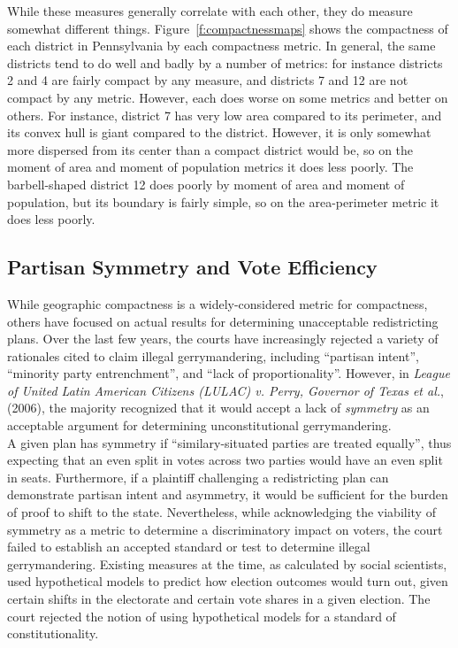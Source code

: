\documentclass[12pt]{article}
\begin{document}
  While these measures generally correlate with each other, they do measure somewhat different things.  Figure~\ref{f:compactnessmaps} shows the compactness of each district in Pennsylvania by each compactness metric.  In general, the same districts tend to do well and badly by a number of metrics: for instance districts 2 and 4 are fairly compact by any measure, and districts 7 and 12 are not compact by any metric.  However, each does worse on some metrics and better on others.  For instance, district 7 has very low area compared to its perimeter, and its convex hull is giant compared to the district.  However, it is only somewhat more dispersed from its center than a compact district would be, so on the moment of area and moment of population metrics it does less poorly.  The barbell-shaped district 12 does poorly by moment of area and moment of population, but its boundary is fairly simple, so on the area-perimeter metric it does less poorly.
  
    \subsection{Partisan Symmetry and Vote Efficiency}
 While geographic compactness is a widely-considered metric for compactness, others have focused on actual results for determining unacceptable redistricting plans.  Over the last few years, the courts have increasingly rejected a variety of rationales cited to claim illegal gerrymandering, including ``partisan intent'',  ``minority party entrenchment'', and ``lack of proportionality''.  However, in \textit{League of United Latin American Citizens (LULAC) v. Perry, Governor of Texas et al.}, (2006), the majority recognized that it would accept a lack of \textit{symmetry} as an acceptable argument for determining unconstitutional gerrymandering. \\
  
  A given plan has symmetry if ``similary-situated parties are treated equally'', thus expecting that an even split in votes across two parties would have an even split in seats. Furthermore, if a plaintiff challenging a redistricting plan can demonstrate partisan intent and asymmetry, it would be sufficient for the burden of proof to shift to the state.  Nevertheless, while acknowledging the viability of symmetry as a metric to determine a discriminatory impact on voters, the court failed to establish an accepted standard or test to determine illegal gerrymandering.  Existing measures at the time, as calculated by social scientists, used hypothetical models to predict how election outcomes would turn out, given certain shifts in the electorate and certain vote shares in a given election. The court rejected the notion of using hypothetical models for a standard of constitutionality. \cite{LULAC} \\
  
\end{document}
